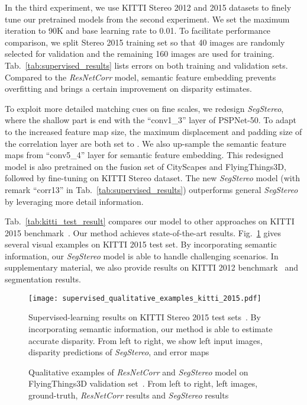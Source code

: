 \documentclass[runningheads]{llncs}
\begin{document}
In the third experiment, we use KITTI Stereo 2012 and 2015 datasets to finely tune our pretrained models from the second experiment. We set the maximum iteration to 90K and base learning rate to 0.01. To facilitate performance comparison, we split Stereo 2015 training set \cite{luo2016efficient} so that 40 images are randomly selected for validation and the remaining 160 images are used for training. Tab.~\ref{tab:supervised_results} lists errors on both training and validation sets. Compared to the \emph{ResNetCorr} model, semantic feature embedding prevents overfitting and brings a certain improvement on disparity estimates. 

To exploit more detailed matching cues on fine scales, we redesign \emph{SegStereo}, where the shallow part is end with the ``conv1\_3'' layer of PSPNet-50. To adapt to the increased feature map size, the maximum displacement and padding size of the correlation layer are both set to . We also up-sample the semantic feature maps from ``conv5\_4'' layer for semantic feature embedding. This redesigned model is also pretrained on the fusion set of CityScapes and FlyingThings3D, followed by fine-tuning on KITTI Stereo dataset. The new \emph{SegStereo} model (with remark ``corr13'' in Tab.~\ref{tab:supervised_results}) outperforms general \emph{SegStereo} by leveraging more detail information.

Tab.~\ref{tab:kitti_test_result} compares our model to other approaches on KITTI 2015 benchmark~\cite{Menze2015CVPR}. Our method achieves state-of-the-art results. Fig.~\ref{supervised_qualitative_results} gives several visual examples on KITTI 2015 test set. By incorporating semantic information, our \emph{SegStereo} model is able to handle challenging scenarios. In supplementary material, we also provide results on KITTI 2012 benchmark~\cite{Geiger2012CVPR} and segmentation results.

\begin{figure}[!t]
  \centering
  \texttt{[image: supervised\_qualitative\_examples\_kitti\_2015.pdf]}
  \caption{Supervised-learning results on KITTI Stereo 2015 test sets~\cite{Menze2015CVPR}. By incorporating semantic information, our method is able to estimate accurate disparity. From left to right, we show left input images, disparity predictions of \emph{SegStereo}, and error maps}  
  \label{supervised_qualitative_results}
\end{figure}

\begin{figure}[t!]
  \centering
  \caption{Qualitative examples of \emph{ResNetCorr} and \emph{SegStereo} model on FlyingThings3D validation set~\cite{mayer2016large}. From left to right, left images, ground-truth, \emph{ResNetCorr} results and \emph{SegStereo} results}
  \label{fig:fly_examples}  
\end{figure}
\end{document}
